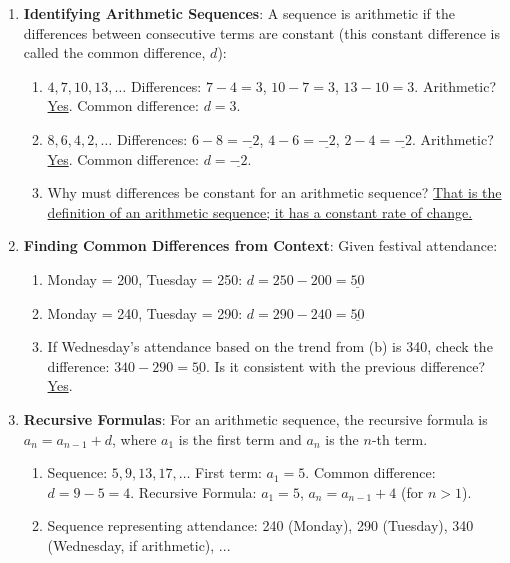 \documentclass[12pt]{article}
\begin{document}
\begin{enumerate}[label=18.\arabic*]
    \item \textbf{Identifying Arithmetic Sequences}: A sequence is arithmetic if the differences between consecutive terms are constant (this constant difference is called the common difference, \(d\)):
    \begin{enumerate}[label=\alph*)]
        \item \( 4, 7, 10, 13, \ldots \)
        Differences: \( 7 - 4 = 3 \), \( 10 - 7 = 3 \), \( 13 - 10 = 3 \).
        Arithmetic? \underline{Yes}. Common difference: \( d = 3 \).
        \item \( 8, 6, 4, 2, \ldots \)
        Differences: \( 6 - 8 = \underline{-2} \), \( 4 - 6 = \underline{-2} \), \( 2 - 4 = \underline{-2} \).
        Arithmetic? \underline{Yes}. Common difference: \( d = \underline{-2} \).
        \item Why must differences be constant for an arithmetic sequence? \underline{That is the definition of an arithmetic sequence; it has a constant rate of change.}
    \end{enumerate}
    \item \textbf{Finding Common Differences from Context}: Given festival attendance:
    \begin{enumerate}[label=\alph*)]
        \item Monday = 200, Tuesday = 250: \( d = 250 - 200 = \underline{50} \)
        \item Monday = 240, Tuesday = 290: \( d = 290 - 240 = \underline{50} \)
        \item If Wednesday's attendance based on the trend from (b) is 340, check the difference: \( 340 - 290 = \underline{50} \). Is it consistent with the previous difference? \underline{Yes}.
    \end{enumerate}
    \item \textbf{Recursive Formulas}: For an arithmetic sequence, the recursive formula is \( a_n = a_{n-1} + d \), where \(a_1\) is the first term and \(a_n\) is the \(n\)-th term.
    \begin{enumerate}[label=\alph*)]
        \item Sequence: \( 5, 9, 13, 17, \ldots \)
        First term: \( a_1 = 5 \). Common difference: \( d = 9-5 = 4 \).
        Recursive Formula: \( a_1 = 5 \), \( a_n = a_{n-1} + 4 \) (for \(n > 1\)).
        \item Sequence representing attendance: 240 (Monday), 290 (Tuesday), 340 (Wednesday, if arithmetic), ...

\end{enumerate}
\end{enumerate}
\end{document}
